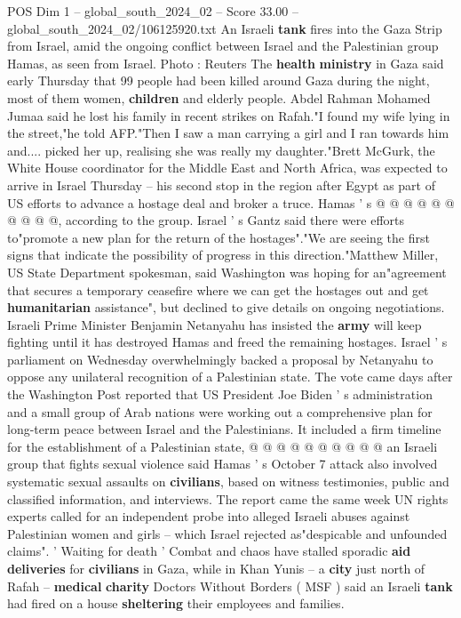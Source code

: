 \begin{textsample}{POS Dim 1 – global\_south\_2024\_02 – Score 33.00 – global\_south\_2024\_02/106125920.txt}
An Israeli \textbf{tank} fires into the Gaza Strip from Israel, amid the ongoing conflict between Israel and the Palestinian group Hamas, as seen from Israel.
Photo : Reuters The \textbf{health} \textbf{ministry} in Gaza said early Thursday that 99 people had been killed around Gaza during the night, most of them women, \textbf{children} and elderly people.
Abdel Rahman Mohamed Jumaa said he lost his family in recent strikes on Rafah."I found my wife lying in the street,"he told AFP."Then I saw a man carrying a girl and I ran towards him and.... picked her up, realising she was really my daughter."Brett McGurk, the White House coordinator for the Middle East and North Africa, was expected to arrive in Israel Thursday -- his second stop in the region after Egypt as part of US efforts to advance a hostage deal and broker a truce.
Hamas ' s @ @ @ @ @ @ @ @ @ @, according to the group.
Israel ' s Gantz said there were efforts to"promote a new plan for the return of the hostages"."We are seeing the first signs that indicate the possibility of progress in this direction."Matthew Miller, US State Department spokesman, said Washington was hoping for an"agreement that secures a temporary ceasefire where we can get the hostages out and get \textbf{humanitarian} assistance", but declined to give details on ongoing negotiations.
Israeli Prime Minister Benjamin Netanyahu has insisted the \textbf{army} will keep fighting until it has destroyed Hamas and freed the remaining hostages.
Israel ' s parliament on Wednesday overwhelmingly backed a proposal by Netanyahu to oppose any unilateral recognition of a Palestinian state.
The vote came days after the Washington Post reported that US President Joe Biden ' s administration and a small group of Arab nations were working out a comprehensive plan for long-term peace between Israel and the Palestinians.
It included a firm timeline for the establishment of a Palestinian state, @ @ @ @ @ @ @ @ @ @ an Israeli group that fights sexual violence said Hamas ' s October 7 attack also involved systematic sexual assaults on \textbf{civilians}, based on witness testimonies, public and classified information, and interviews.
The report came the same week UN rights experts called for an independent probe into alleged Israeli abuses against Palestinian women and girls -- which Israel rejected as"despicable and unfounded claims". ' Waiting for death ' Combat and chaos have stalled sporadic \textbf{aid} \textbf{deliveries} for \textbf{civilians} in Gaza, while in Khan Yunis -- a \textbf{city} just north of Rafah -- \textbf{medical} \textbf{charity} Doctors Without Borders ( MSF ) said an Israeli \textbf{tank} had fired on a house \textbf{sheltering} their employees and families.

\end{textsample}
